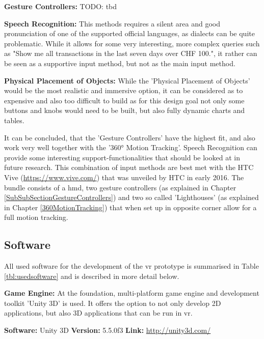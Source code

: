 \textbf{Gesture Controllers:}
TODO: tbd

\textbf{Speech Recognition:}
This methods requires a silent area and good pronunciation of one of the supported official languages, as dialects can be quite problematic. While it allows for some very interesting, more complex queries such as "Show me all transactions in the last seven days over CHF 100.", it rather can be seen as a supportive input method, but not as the main input method.

\textbf{Physical Placement of Objects:}
While the 'Physical Placement of Objects' would be the most realistic and immersive option, it can be considered as to expensive and also too difficult to build as for this design goal not only some buttons and knobs would need to be built, but also fully dynamic charts and tables.


It can be concluded, that the 'Gesture Controllers' have the highest fit, and also work very well together with the '360° Motion Tracking'. Speech Recognition can provide some interesting support-functionalities that should be looked at in future research. \newline
This combination of input methods are best met with the HTC Vive (\url{https://www.vive.com/}) that was unveiled by HTC in early 2016. The bundle consists of a \gls{hmd}, two gesture controllers (as explained in Chapter \ref{SubSubSectionGestureControllers}) and two so called 'Lighthouses' (as explained in Chapter \ref{360MotionTracking}) that when set up in opposite corner allow for a full motion tracking.




\subsection{Software}

All used software for the development of the \gls{vr} prototype is summarised in Table \ref{tbl:usedsoftware} and is described in more detail below.

\textbf{Game Engine:}
At the foundation, \cite{Unity2016} multi-platform game engine and development toolkit 'Unity 3D' is used. It offers the option to not only develop 2D applications, but also 3D applications that can be run in \gls{vr}.

\textbf{Software:} Unity 3D \newline
\textbf{Version:} 5.5.0f3 \newline
\textbf{Link:} \url{http://unity3d.com/}


